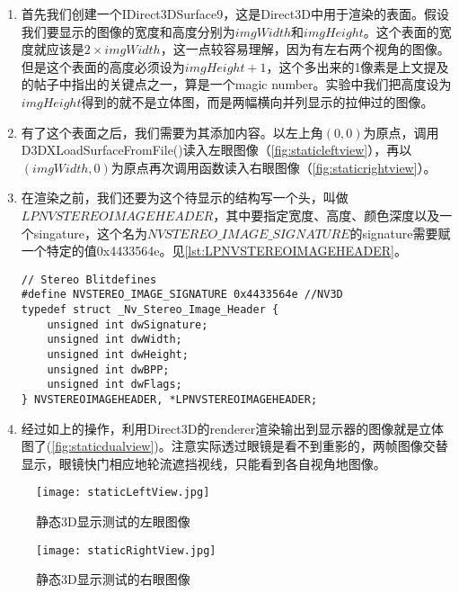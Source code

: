 \begin{enumerate}
\item 首先我们创建一个IDirect3DSurface9，这是Direct3D中用于渲染的表面。假设我们要显示的图像的宽度和高度分别为$imgWidth$和$imgHeight$。这个表面的宽度就应该是$2\times imgWidth$，这一点较容易理解，因为有左右两个视角的图像。但是这个表面的高度必须设为$imgHeight+1$，这个多出来的1像素是上文提及的帖子中指出的关键点之一，算是一个magic number。实验中我们把高度设为$imgHeight$得到的就不是立体图，而是两幅横向并列显示的拉伸过的图像。
\item 有了这个表面之后，我们需要为其添加内容。以左上角$(0,0)$为原点，调用D3DXLoadSurfaceFromFile()读入左眼图像（\autoref{fig:staticleftview}），再以$(imgWidth,0)$为原点再次调用函数读入右眼图像（\autoref{fig:staticrightview}）。
\item 在渲染之前，我们还要为这个待显示的结构写一个头，叫做$LPNVSTEREOIMAGEHEADER$，其中要指定宽度、高度、颜色深度以及一个singature，这个名为$NVSTEREO\_IMAGE\_SIGNATURE$的signature需要赋一个特定的值0x4433564e。见\autoref{lst:LPNVSTEREOIMAGEHEADER}。
\begin{lstlisting}[caption = {LPNVSTEREOIMAGEHEADER的结构}, label = lst:LPNVSTEREOIMAGEHEADER]
// Stereo Blitdefines
#define NVSTEREO_IMAGE_SIGNATURE 0x4433564e //NV3D
typedef struct _Nv_Stereo_Image_Header {
    unsigned int dwSignature;
    unsigned int dwWidth;
    unsigned int dwHeight;
    unsigned int dwBPP;
    unsigned int dwFlags;
} NVSTEREOIMAGEHEADER, *LPNVSTEREOIMAGEHEADER;
\end{lstlisting}
\item 经过如上的操作，利用Direct3D的renderer渲染输出到显示器的图像就是立体图了(\autoref{fig:staticdualview})。注意实际透过眼镜是看不到重影的，两帧图像交替显示，眼镜快门相应地轮流遮挡视线，只能看到各自视角地图像。
\end{enumerate}

\begin{figure}
\begin{minipage}{0.5\textwidth}
	\centering
	\texttt{[image: staticLeftView.jpg]}
	\caption{静态3D显示测试的左眼图像}
	\label{fig:staticleftview}
\end{minipage}\hfill
\begin{minipage}{0.5\textwidth}
	\centering
	\texttt{[image: staticRightView.jpg]}
	\caption{静态3D显示测试的右眼图像}
	\label{fig:staticrightview}
\end{minipage}
\end{figure}

